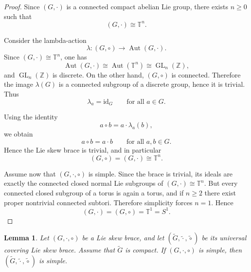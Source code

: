 \documentclass[reqno]{amsart}
\newtheorem{lemma}[theorem]{Lemma}
\DeclareMathOperator{\Aut}{Aut}
\DeclareMathOperator{\GL}{GL}
\newcommand{\id}{\mathrm{id}}
\begin{document}
\begin{proof}
Since $(G,\cdot)$ is a connected compact abelian Lie group, there exists
$n\ge 0$ such that
\[
(G,\cdot)\cong \mathbb{T}^n.
\]

Consider the lambda-action
\[
\lambda:(G,\circ)\longrightarrow \Aut(G,\cdot).
\]
Since $(G,\cdot)\cong \mathbb{T}^n$, one has
\[
\Aut(G,\cdot)\cong \Aut(\mathbb{T}^n)\cong \GL_n(\mathbb{Z}),
\]
and $\GL_n(\mathbb{Z})$ is discrete. On the other hand, $(G,\circ)$ is
connected. Therefore the image $\lambda(G)$ is a connected subgroup of a
discrete group, hence it is trivial. Thus
\[
\lambda_a=\id_G
\qquad\text{for all }a\in G.
\]

Using the identity
\[
a\circ b=a\cdot \lambda_a(b),
\]
we obtain
\[
a\circ b=a\cdot b
\qquad\text{for all }a,b\in G.
\]
Hence the Lie skew brace is trivial, and in particular
\[
(G,\circ)=(G,\cdot)\cong \mathbb{T}^n.
\]

Assume now that $(G,\cdot,\circ)$ is simple. Since the brace is trivial, its
ideals are exactly the connected closed normal Lie subgroups of
$(G,\cdot)\cong \mathbb{T}^n$. But every connected closed subgroup of a torus
is again a torus, and if $n\ge 2$ there exist proper nontrivial connected
subtori. Therefore simplicity forces $n=1$. Hence
\[
(G,\cdot)=(G,\circ)=\mathbb{T}^1=S^1.
\]
\end{proof}

\begin{lemma}\label{lem:universal-cover-compact}
Let $(G,\cdot,\circ)$ be a Lie skew brace, and let
$(\widetilde G,\widetilde\cdot,\widetilde\circ)$
be its universal covering Lie skew brace. Assume that $\widetilde G$ is
compact. If $(G,\cdot,\circ)$ is simple, then
$(\widetilde G,\widetilde\cdot,\widetilde\circ)$
is simple.
\end{lemma}
\end{document}
